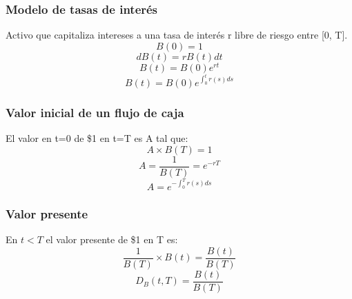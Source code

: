 \begin{frame}
    \frametitle{Modelo de tasas de interés}
    \begin{defin}
        Activo que capitaliza intereses a una tasa de interés r libre de riesgo entre [0, T].\\
        \begin{equation*}
            B(0) = 1 
        \end{equation*}
        \begin{equation*}
            dB(t) = rB(t)dt
        \end{equation*}
        \begin{equation*}
            B(t) = B(0)e^{rt}
        \end{equation*}
        \begin{equation*}
            B(t) = B(0)e^{\int_0^t r(s)ds}
        \end{equation*}
    \end{defin}
\end{frame}


\begin{frame}
    \frametitle{Valor inicial de un flujo de caja}
    \begin{defin}
        El valor en t=0 de \$1 en t=T es A tal que:
        \begin{equation*}
            A \times B(T) = 1
        \end{equation*}
        \begin{equation*}
            A = \frac{1}{B(T)} = e^{-rT}
        \end{equation*}
        \begin{equation*}
            A = e^{-\int_0^T r(s)ds}
        \end{equation*}
    \end{defin}
\end{frame}

\begin{frame}
    \frametitle{Valor presente}
    \begin{defin}
        En $t<T$ el valor presente de \$1 en T es:
        \begin{equation*}
            \frac{1}{B(T)} \times B(t) = \frac{B(t)}{B(T)}
        \end{equation*}
        \begin{equation*}
           D_B(t,T) = \frac{B(t)}{B(T)}
        \end{equation*}
    \end{defin}
\end{frame}

